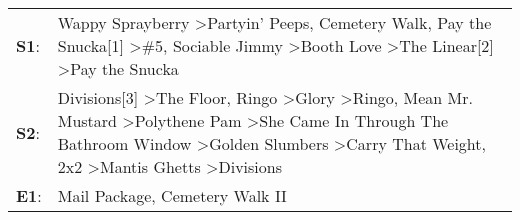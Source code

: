 \begin{supertabular}{p{0.03\textwidth}p{0.92\textwidth}}
 \textbf{S1}:  &                                                                                                                                                                                                                     Wappy Sprayberry\textsuperscript{} \textgreater \enspace Partyin' Peeps\textsuperscript{}, \enspace Cemetery Walk\textsuperscript{}, \enspace Pay the Snucka[1]\textsuperscript{} \textgreater \enspace \#5\textsuperscript{}, \enspace Sociable Jimmy\textsuperscript{} \textgreater \enspace Booth Love\textsuperscript{} \textgreater \enspace The Linear[2]\textsuperscript{} \textgreater \enspace Pay the Snucka\textsuperscript{}  \enspace  \\
 \textbf{S2}:  &  Divisions[3]\textsuperscript{} \textgreater \enspace The Floor\textsuperscript{}, \enspace Ringo\textsuperscript{} \textgreater \enspace Glory\textsuperscript{} \textgreater \enspace Ringo\textsuperscript{}, \enspace Mean Mr. Mustard\textsuperscript{} \textgreater \enspace Polythene Pam\textsuperscript{} \textgreater \enspace She Came In Through The Bathroom Window\textsuperscript{} \textgreater \enspace Golden Slumbers\textsuperscript{} \textgreater \enspace Carry That Weight\textsuperscript{}, \enspace 2x2\textsuperscript{} \textgreater \enspace Mantis Ghetts\textsuperscript{} \textgreater \enspace Divisions\textsuperscript{}  \enspace  \\
 \textbf{E1}:  &                                                                                                                                                                                                                                                                                                                                                                                                                                                                                                                                                                                  Mail Package\textsuperscript{}, \enspace Cemetery Walk II\textsuperscript{}  \enspace  \\
\end{supertabular}
